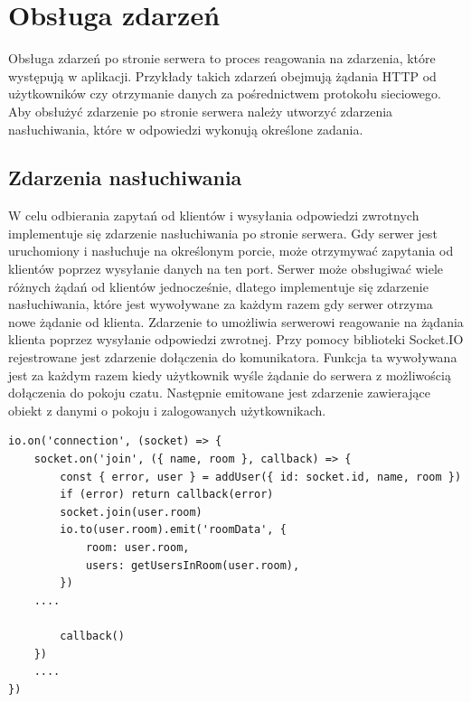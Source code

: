 \section{Obsługa zdarzeń}
Obsługa zdarzeń po stronie serwera to proces reagowania na zdarzenia, które występują w aplikacji. Przykłady takich zdarzeń obejmują żądania HTTP od użytkowników czy otrzymanie danych za pośrednictwem protokołu sieciowego. Aby obsłużyć zdarzenie po stronie serwera należy utworzyć zdarzenia nasłuchiwania, które w odpowiedzi wykonują określone zadania.
\subsection{Zdarzenia nasłuchiwania}
W celu odbierania zapytań od klientów i wysyłania odpowiedzi zwrotnych implementuje się zdarzenie nasłuchiwania po stronie serwera. Gdy serwer jest uruchomiony i nasłuchuje na określonym porcie, może otrzymywać zapytania od klientów poprzez wysyłanie danych na ten port. Serwer może obsługiwać wiele różnych żądań od klientów jednocześnie, dlatego implementuje się zdarzenie nasłuchiwania, które jest wywoływane za każdym razem gdy serwer otrzyma nowe żądanie od klienta. Zdarzenie to umożliwia serwerowi reagowanie na żądania klienta poprzez wysyłanie odpowiedzi zwrotnej. 
Przy pomocy biblioteki Socket.IO rejestrowane jest zdarzenie dołączenia do komunikatora. Funkcja ta wywoływana jest za każdym razem kiedy użytkownik wyśle żądanie do serwera z możliwością dołączenia do pokoju czatu. Następnie emitowane jest zdarzenie zawierające obiekt z danymi o pokoju i zalogowanych użytkownikach.
\begin{lstlisting}[caption=Implementacja zdarzenia dolaczenia i pobierania danych]
io.on('connection', (socket) => {
    socket.on('join', ({ name, room }, callback) => {
        const { error, user } = addUser({ id: socket.id, name, room })
        if (error) return callback(error)
        socket.join(user.room)
        io.to(user.room).emit('roomData', {
            room: user.room,
            users: getUsersInRoom(user.room),
        })
	....		

        callback()
    })
	....
})
\end{lstlisting}

